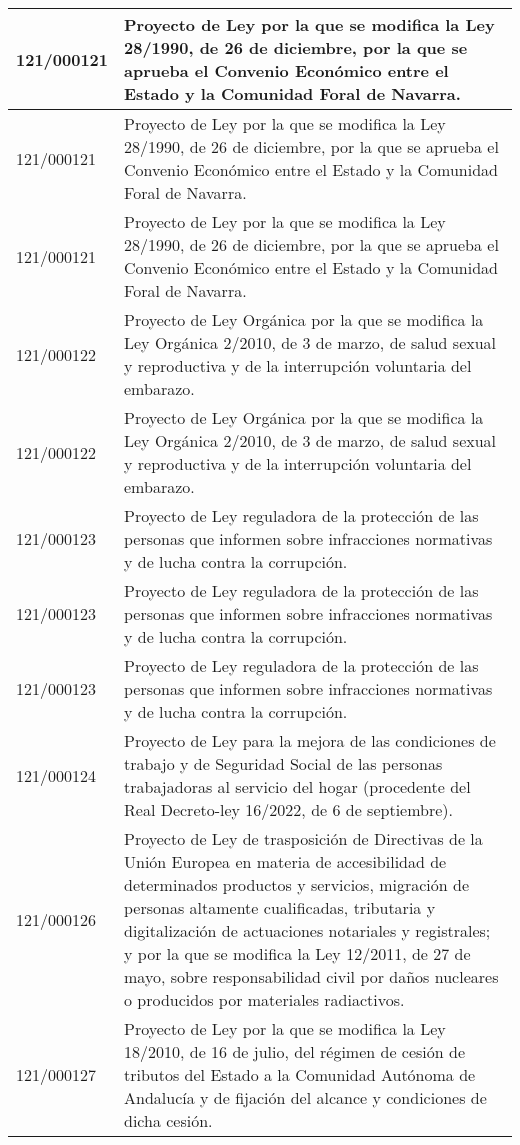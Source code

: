 {\begin{table}[H]
\begin{center}
\begin{tabularx}{\linewidth}{| l | X |}
\hline
121/000121 & Proyecto de Ley por la que se modifica la Ley 28/1990, de 26 de diciembre, por la que se aprueba el Convenio Económico entre el Estado y la Comunidad Foral de Navarra. \\
\hline
121/000121 & Proyecto de Ley por la que se modifica la Ley 28/1990, de 26 de diciembre, por la que se aprueba el Convenio Económico entre el Estado y la Comunidad Foral de Navarra. \\
\hline
121/000121 & Proyecto de Ley por la que se modifica la Ley 28/1990, de 26 de diciembre, por la que se aprueba el Convenio Económico entre el Estado y la Comunidad Foral de Navarra. \\
\hline
121/000122 & Proyecto de Ley Orgánica por la que se modifica la Ley Orgánica 2/2010, de 3 de marzo, de salud sexual y reproductiva y de la interrupción voluntaria del embarazo. \\
\hline
121/000122 & Proyecto de Ley Orgánica por la que se modifica la Ley Orgánica 2/2010, de 3 de marzo, de salud sexual y reproductiva y de la interrupción voluntaria del embarazo. \\
\hline
121/000123 & Proyecto de Ley reguladora de la protección de las personas que informen sobre infracciones normativas y de lucha contra la corrupción. \\
\hline
121/000123 & Proyecto de Ley reguladora de la protección de las personas que informen sobre infracciones normativas y de lucha contra la corrupción. \\
\hline
121/000123 & Proyecto de Ley reguladora de la protección de las personas que informen sobre infracciones normativas y de lucha contra la corrupción. \\
\hline
121/000124 & Proyecto de Ley para la mejora de las condiciones de trabajo y de Seguridad Social de las personas trabajadoras al servicio del hogar (procedente del Real Decreto-ley 16/2022, de 6 de septiembre). \\
\hline
121/000126 & Proyecto de Ley de trasposición de Directivas de la Unión Europea en materia de accesibilidad de determinados productos y servicios, migración de personas altamente cualificadas, tributaria y digitalización de actuaciones notariales y registrales; y por la que se modifica la Ley 12/2011, de 27 de mayo, sobre responsabilidad civil por daños nucleares o producidos por materiales radiactivos. \\
\hline
121/000127 & Proyecto de Ley por la que se modifica la Ley 18/2010, de 16 de julio, del régimen de cesión de tributos del Estado a la Comunidad Autónoma de Andalucía y de fijación del alcance y condiciones de dicha cesión. \\

\end{tabularx}
\end{center}
\end{table}}
